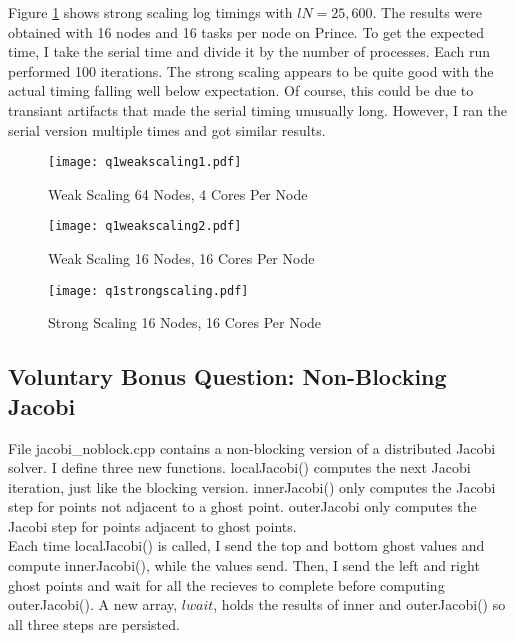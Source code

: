 \documentclass[10pt]{article}
\begin{document}
Figure \ref{fig2a} shows strong scaling log timings with $lN = 25,600$. The results were obtained with 16 nodes and 16 tasks per node on Prince. To get the expected time, I take the serial time and divide it by the number of processes. Each run performed 100 iterations. The strong scaling appears to be quite good with the actual timing falling well below expectation. Of course, this could be due to transiant artifacts that made the serial timing unusually long. However, I ran the serial version multiple times and got similar results.

\lipsum

\begin{figure}[!h]
    \centering
    \begin{minipage}{0.45\textwidth}
        \centering
        \texttt{[image: q1weakscaling1.pdf]} %
        \caption{Weak Scaling 64 Nodes, 4 Cores Per Node}
        \label{fig1}
    \end{minipage}\hfill
         \begin{minipage}{0.45\textwidth}
        \centering
        \texttt{[image: q1weakscaling2.pdf]} %
        \caption{Weak Scaling 16 Nodes, 16 Cores Per Node}
        \label{fig2}
    \end{minipage}
     \begin{minipage}{0.45\textwidth}
        \centering
        \texttt{[image: q1strongscaling.pdf]} %
        \caption{Strong Scaling 16 Nodes, 16 Cores Per Node}
        \label{fig2a}
    \end{minipage}
\end{figure}

\lipsum

\subsection{Voluntary Bonus Question: Non-Blocking Jacobi}

File jacobi\_noblock.cpp contains a non-blocking version of a distributed Jacobi solver. I define three new functions. localJacobi() computes the next Jacobi iteration, just like the blocking version. innerJacobi() only computes the Jacobi step for points not adjacent to a ghost point. outerJacobi only computes the Jacobi step for points adjacent to ghost points.\\

Each time localJacobi() is called, I send the top and bottom ghost values and compute innerJacobi(), while the values send. Then, I send the left and right ghost points and wait for all the recieves to complete before computing outerJacobi(). A new array, $lwait$, holds the results of inner and outerJacobi() so all three steps are persisted.\\
\end{document}
